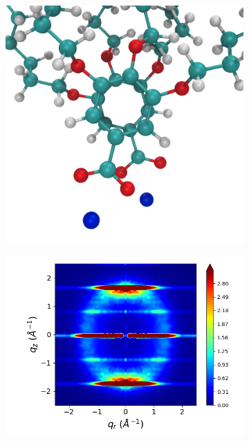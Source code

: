 \documentclass[journal=jpcbfk,manusciprt=article]{achemso}
\begin{document}
\begin{figure}[htb]
\begin{subfigure}{0.3\linewidth}
	\label{fig:staggered}
  \end{subfigure}
  \begin{subfigure}{0.3\linewidth}
  	\centering
  	\includegraphics[width=\textwidth]{rotated_monomers.png}
  	\label{fig:rotated_monomers}
  \end{subfigure}
  \begin{subfigure}{0.3\linewidth}
  	\centering
  	\includegraphics[width=\textwidth]{rotated_carboxylate_rzplot_restrained.png}

\end{subfigure}
\end{figure}
\end{document}
